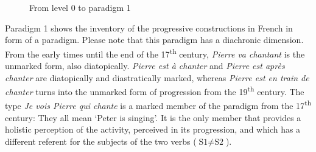 \documentclass[output=paper]{langsci/langscibook}
\begin{document}
  
\begin{figure}
 \caption{From level 0 to paradigm 1\label{fig:kragh:3}}
 \end{figure}

Paradigm 1 shows the inventory of the progressive constructions in French in form of a paradigm. Please note that this paradigm has a diachronic dimension. From the early times until the end of the 17\textsuperscript{th} century, \textit{Pierre va chantant} is the unmarked form, also diatopically. \textit{Pierre est à chanter} and \textit{Pierre est après chanter} are diatopically and diastratically marked, whereas \textit{Pierre est en train de chanter} turns into the unmarked form of progression from the 19\textsuperscript{th} century. The type \textit{Je vois Pierre qui chante} is a marked member of the paradigm from the 17\textsuperscript{th} century: They all mean `Peter is singing'. It is the only member that provides a holistic perception of the activity, perceived in its progression, and which has a different referent for the subjects of the two verbs ($\text{S1} \neq \text{S2}$).

\begin{table}
\caption{Progressivity in French, progressive constructions (Kragh \& Schøsler, 2015:  290)\label{tab:kragh:1}}
\end{table}
\end{document}
